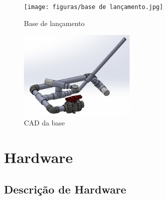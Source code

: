 
 \begin{figure}[H]
     \centering
     \texttt{[image: figuras/base de lançamento.jpg]}
    \caption{Base de lançamento}
     \label{fig:tabela}
 \end{figure}

 \begin{figure}[H]
     \centering
     \includegraphics[width=0.5\textwidth]{figuras/cad da base.jpg}
    \caption{CAD da base}
     \label{fig:tabela}
 \end{figure}

 \section{Hardware}

 \subsection{Descrição de Hardware}

